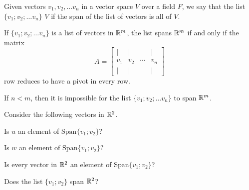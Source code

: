 





Given vectors $v_1, v_2, \ldots v_n$ in a vector space $V$ over a field $F$, we say that the list $\{v_1; v_2; \ldots v_n\}$ {} $V$ if 
the span of the list of vectors is all of $V$.



\endedxtext



If $\{v_1; v_2; \ldots v_n\}$ is a list of vectors in $\mathbb R^m$, the list spans $\mathbb R^m$ if and only if 
the matrix 
\[ A = \left[ \begin{array}{cccc} | & | & & | \\ 
v_1 & v_2 & \cdots & v_n \\
 | & | & & | \end{array} \right] \]
 row reduces to have a pivot in every row.  
 

If $n<m$, then it is impossible for the list $\{v_1; v_2; \ldots v_n\}$ to span $\mathbb R^m$.    


\endedxtext


\endedxvertical






Consider the following vectors in $\mathbb R^2$.  

\begin{center}
   
\end{center}

Is $u$ an element of $\mathrm{Span}\{v_1; v_2\}$?  



Is $w$ an element of $\mathrm{Span}\{v_1; v_2\}$?  



Is every vector in $\mathbb R^2$ an element of $\mathrm{Span}\{v_1; v_2\}$?  


Does the list $\{v_1; v_2\}$ span $\mathbb R^2$?  





